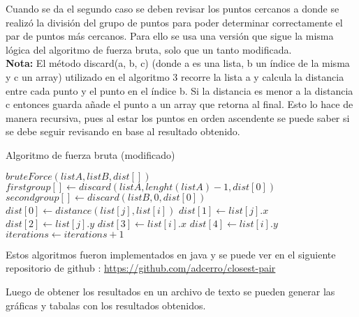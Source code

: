Cuando se da el segundo caso se deben revisar los puntos cercanos a donde se realizó la división del grupo de puntos para poder determinar correctamente el par de puntos más cercanos. Para ello se usa una versión que sigue la misma lógica del algoritmo de fuerza bruta, solo que un tanto modificada.\\

\textbf{Nota: } El método discard(a, b, c) (donde a es una lista, b un índice de la misma y c un array) utilizado en el algoritmo 3 recorre la lista a y calcula la distancia entre cada punto y el punto en el índice b. Si la distancia es menor a la distancia c entonces guarda añade el punto a un array que retorna al final.
Esto lo hace de manera recursiva, pues al estar los puntos en orden ascendente se puede saber si se debe seguir revisando en base al resultado obtenido.\\

\begin{algorithm}[h!]
\caption{Algoritmo de fuerza bruta (modificado)}
\begin{algorithmic}
\State $bruteForce(listA, listB, dist[])$
    \State $firstgroup[] \gets discard(listA,lenght(listA)-1,dist[0])$
    \State $secondgroup[] \gets discard(listB,0,dist[0])$
            \State $dist[0] \gets distance(list[j], list[i])$
            \State $ dist[1] \gets list[j].x$
            \State $ dist[2] \gets list[j].y$
            \State $ dist[3] \gets list[i].x$
            \State $ dist[4] \gets list[i].y$
        \EndIf
        \EndFor
        \State $ iterations \gets iterations + 1$
    \EndFor
\end{algorithmic}    
\end{algorithm}
\FloatBarrier
Estos algoritmos fueron implementados en java y se puede ver en el siguiente repositorio de github : \url{https://github.com/adcerro/closest-pair}

Luego de obtener los resultados en un archivo de texto se pueden generar las gráficas y tabalas con los resultados obtenidos.